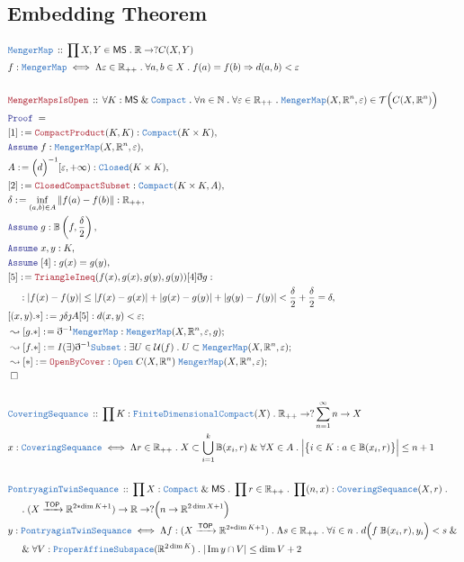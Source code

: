 \documentclass[12pt]{scrartcl}
\newcommand{\TYPE}[1]{\textcolor{NavyBlue}{\mathtt{#1}}}
\newcommand{\LOGIC}[1]{\textcolor{Blue}{\mathtt{#1}}}
\newcommand{\THM}[1]{\textcolor{Maroon}{\mathtt{#1}}}
\renewcommand{\.}{\; . \;}
\newcommand{\de}{: \kern 0.1pc =}
\newcommand{\Act}[1]{\left( #1 \right)}
\newcommand{\Theorem}[2]{& \THM{#1} \, :: \, #2 \\ & \Proof = \\ }
\newcommand{\DeclareType}[2]{& \TYPE{#1} \, :: \, #2 \\}
\newcommand{\DefineType}[3]{& #1 : \TYPE{#2} \iff #3 \\}
\newcommand{\NewLine}{\\ & \kern 1pc}
\newcommand{\Page}[1]{ \begin{align*} #1 \end{align*}   }
\newcommand{ \bd }{ \ByDef }
\renewcommand{\And}{\; \& \;}
\newcommand{\Imply}{\Rightarrow}
\newcommand{\Reals}{\mathbb{R} }
\newcommand{\Nat}{\mathbb{N} }
\DeclareMathOperator*{\im}{Im}
\newcommand{\Arrow}{\xrightarrow}
\newcommand{\Say}[3]{& #1 \de #2 : #3, \\}
\newcommand{\Conclude}[3]{& #1 \de #2 : #3; \\}
\newcommand{\DeriveConclude}[3]{& \leadsto #1 \de #2 : #3 ; \\}
\newcommand{\Assume}[2]{& \LOGIC{Assume} \; #1 : #2, \\}
\newcommand{\QED}{\; \square}
\newcommand{\EndProof}{& \QED \\}
\newcommand{\ByDef}{\eth}
\newcommand{\ByConstr}{\jmath}
\newcommand{\Proof}{\LOGIC{Proof} \; }
\newcommand{\TOP}{\mathsf{TOP}}
\newcommand{\T}{\mathcal{T}}
\renewcommand{\U}{\mathcal{U}}
\newcommand{\MS}{\mathsf{MS}}
\begin{document}
\subsection{Embedding Theorem}
\Page{
	\DeclareType{MengerMap}{\prod X, Y \in \MS \. \Reals \to ?C(X,Y)}
	\DefineType{f}{MengerMap}{\Lambda \varepsilon \in \Reals_{++} \.  \forall a,b \in X \. f(a) = f(b) \Imply d(a,b) < \varepsilon}
	\\
	\Theorem{MengerMapsIsOpen}{\forall K : \MS \And \TYPE{Compact} \. \forall n \in \Nat \.   \forall \varepsilon \in \Reals_{++} \. \TYPE{MengerMap}(X,\Reals^n,\varepsilon) \in \T\Big( C( X,\Reals^n) \Big)}
	\Say{[1]}{\THM{CompactProduct}(K,K)}{\TYPE{Compact}(K \times K)}
	\Assume{f}{\TYPE{MengerMap}(X,\Reals^n,\varepsilon)}
	\Say{A}{ \Big(d\Big)^{-1}[\varepsilon,+\infty) }{\TYPE{Closed}(K \times K)}
	\Say{[2]}{\THM{ClosedCompactSubset}}{\TYPE{Compact}(K \times K, A)}
	\Say{\delta}{\inf_{(a,b) \in A} \| f(a) - f(b) \| }{\Reals_{++}}
	\Assume{g}{\mathbb{B}\Act{f,\frac{\delta}{2}}}
	\Assume{x,y}{K}
	\Assume{[4]}{g(x) = g(y)}
	\Say{[5]}{\THM{TriangleIneq}(f(x),g(x),g(y),g(y))[4]\bd g }{ \NewLine :|f(x) - f(y)| \le |f(x) -g(x)| + |g(x) - g(y)|  + | g(y) - f(y) | < \frac{\delta}{2} + \frac{\delta}{2} = \delta }
	\Conclude{[(x,y).*]}{\ByConstr \delta  \ByConstr A [5]}{ d(x,y) < \varepsilon }
	\DeriveConclude{[g.*]}{\bd^{-1} \TYPE{MengerMap}}{\TYPE{MengerMap}(X,\Reals^n, \varepsilon, g )}
	\DeriveConclude{[f.*]}{I(\exists)\bd^{-1}\TYPE{Subset}}{\exists U \in \U(f) \. U \subset \TYPE{MengerMap}(X,\Reals^n, \varepsilon) }
	\DeriveConclude{[*]}{\THM{OpenByCover}}{\TYPE{Open} \; C(X,\Reals^n) \;   \TYPE{MengerMap}(X,\Reals^n, \varepsilon) }
	\EndProof
	\\
	\DeclareType{CoveringSequance}{\prod K : \TYPE{FiniteDimensionalCompact}(X) \. \Reals_{++} \to ?\sum^\infty_{n=1} n \to X  }
	\DefineType{x}{CoveringSequance}
	{
		\Lambda r \in \Reals_{++} \. 
		X \subset \bigcup^k_{i=1}  \mathbb{B}(x_i,r) \And  
		\forall X \in A  \. \Big|   \big\{ i \in K :  a \in \mathbb{B}(x_i,r)  \big\} \Big| \le n + 1   
	}
	\\
	\DeclareType{PontryaginTwinSequance}{
		\prod X : \TYPE{Compact} \And \MS \.  
		\prod r \in \Reals_{++} \.  
		\prod  (n,x) : \TYPE{CoveringSequance}(X,r) \. \NewLine \.
		(X \Arrow{\TOP} \Reals^{2*\dim K + 1}) \to \Reals \to  ? \Big(n \to \Reals^{2\dim X + 1} \Big)  }
	\DefineType{y}{PontryaginTwinSequance}
	{
		\Lambda f : (X \Arrow{\TOP} \Reals^{2*\dim K + 1}) \.
		\Lambda s \in \Reals_{++} \.
		\forall i \in n \.    d\Big( f \; \mathbb{B}(x_i, r), y_i \Big) < s \And \NewLine \And
		\forall   V : \TYPE{ProperAffineSubspace}(\Reals^{2 \dim K}) \. 
		| \im y \cap V| \le \dim V + 2    
	}
}
\end{document}
